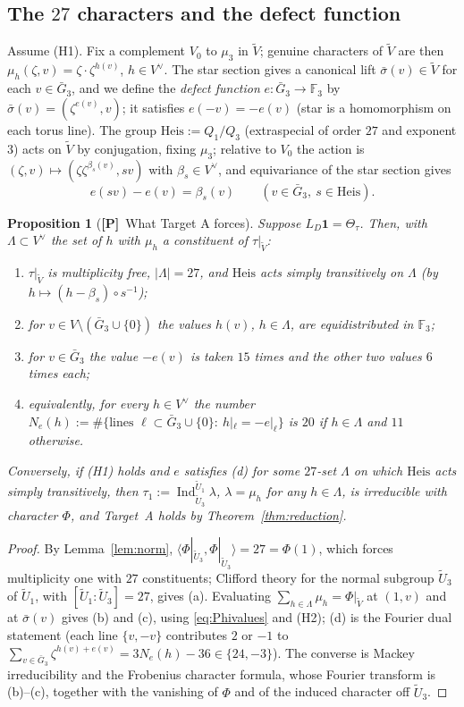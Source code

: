 \documentclass[11pt]{article}
\newcommand{\Fq}{\mathbb F}
\newcommand{\Ind}{\operatorname{Ind}}
\newcommand{\tU}{\widetilde U}
\newcommand{\tV}{\widetilde V}
\newcommand{\Heis}{\mathrm{Heis}}
\newcommand{\Ptag}{\textnormal{\textbf{[P]}}}
\theoremstyle{plain}
\newtheorem{proposition}[theorem]{Proposition}
\theoremstyle{definition}
\begin{document}
\subsection{The $27$ characters and the defect function}
Assume (H1).  Fix a complement $V_0$ to $\mu_3$ in $\tV$; genuine
characters of $\tV$ are then $\mu_h(\zeta,v)=\zeta\cdot\zeta^{h(v)}$,
$h\in V^\vee$.  The star section gives a canonical lift
$\bar\sigma(v)\in\tV$ for each $v\in\bar G_3$, and we define the
\emph{defect function} $e:\bar G_3\to\Fq_3$ by
$\bar\sigma(v)=(\zeta^{e(v)},v)$; it satisfies $e(-v)=-e(v)$
(star is a homomorphism on each torus line).  The group
$\Heis:=Q_1/Q_3$ (extraspecial of order $27$ and exponent $3$) acts on
$\tV$ by conjugation, fixing $\mu_3$; relative to $V_0$ the action is
$(\zeta,v)\mapsto(\zeta\zeta^{\beta_s(v)},sv)$ with $\beta_s\in V^\vee$,
and equivariance of the star section gives
\begin{equation}\label{eq:cocycle}
 e(sv)-e(v)=\beta_s(v)\qquad(v\in\bar G_3,\ s\in\Heis).
\end{equation}

\begin{proposition}[\Ptag\ What Target A forces]\label{prop:forces}
Suppose $L_D\mathbf1=\Theta_\tau$.  Then, with $\Lambda\subset V^\vee$ the
set of $h$ with $\mu_h$ a constituent of $\tau|_{\tV}$:
\begin{enumerate}[label=(\alph*)]
\item $\tau|_{\tV}$ is multiplicity free, $|\Lambda|=27$, and $\Heis$ acts
simply transitively on $\Lambda$ (by $h\mapsto(h-\beta_s)\circ s^{-1}$);
\item for $v\in V\setminus(\bar G_3\cup\{0\})$ the values $h(v)$, $h\in\Lambda$,
are equidistributed in $\Fq_3$;
\item for $v\in\bar G_3$ the value $-e(v)$ is taken $15$ times and the
other two values $6$ times each;
\item equivalently, for every $h\in V^\vee$ the number
$N_e(h):=\#\{\text{lines }\ell\subset\bar G_3\cup\{0\}:\ h|_\ell=-e|_\ell\}$
is $20$ if $h\in\Lambda$ and $11$ otherwise.
\end{enumerate}
Conversely, if (H1) holds and $e$ satisfies (d) for some $27$-set
$\Lambda$ on which $\Heis$ acts simply transitively, then
$\tau_1:=\Ind_{\tU_3}^{\tU_1}\lambda$, $\lambda=\mu_h$ for any $h\in\Lambda$,
is irreducible with character $\Phi$, and Target~A holds by
Theorem~\ref{thm:reduction}.
\end{proposition}
\begin{proof}
By Lemma~\ref{lem:norm}, $\langle\Phi|_{\tU_3},\Phi|_{\tU_3}\rangle=27=\Phi(1)$,
which forces multiplicity one with $27$ constituents; Clifford theory
for the normal subgroup $\tU_3$ of $\tU_1$, with $[\tU_1:\tU_3]=27$,
gives (a).  Evaluating $\sum_{h\in\Lambda}\mu_h=\Phi|_{\tV}$ at
$(1,v)$ and at $\bar\sigma(v)$ gives (b) and (c), using
\eqref{eq:Phivalues} and (H2); (d) is the Fourier dual statement
(each line $\{v,-v\}$ contributes $2$ or $-1$ to
$\sum_{v\in\bar G_3}\zeta^{h(v)+e(v)}=3N_e(h)-36\in\{24,-3\}$).  The
converse is Mackey irreducibility and the Frobenius character formula,
whose Fourier transform is (b)--(c), together with the vanishing of
$\Phi$ and of the induced character off $\tU_3$.
\end{proof}
\end{document}
